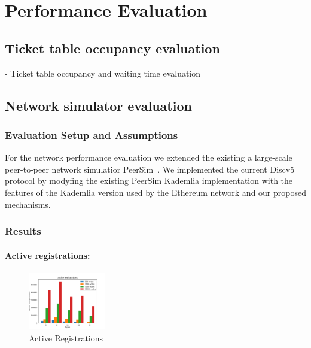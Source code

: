 
\section{Performance Evaluation}\label{sec:eval}

\subsection{Ticket table occupancy evaluation}

- Ticket table occupancy  and waiting time evaluation

\subsection{Network simulator evaluation}

\subsubsection{Evaluation Setup and Assumptions}


For the network performance evaluation we extended the existing 
a large-scale peer-to-peer network simulatior PeerSim~\cite{p2p09-peersim}.
We implemented the current Discv5 protocol by modyfing the existing PeerSim Kademlia implementation with the features of the Kademlia version used by the Ethereum network and our proposed mechanisms.

\subsubsection{Results}

\paragraph{\bf{Active registrations}:}

\begin{figure}[h!]
\centering
\includegraphics[width=0.3\textwidth]{img/eval/registration_origin.png}
\caption{Active Registrations}
\label{fig:regs}
\vspace{-0.15in}
\end{figure}


